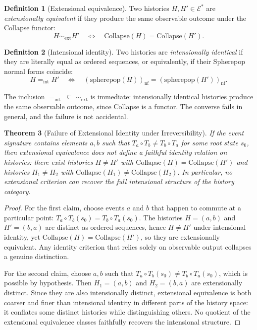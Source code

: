 \documentclass[12pt]{article}
\theoremstyle{plain}
\newtheorem{theorem}{Theorem}[section]
\theoremstyle{definition}
\newtheorem{definition}[theorem]{Definition}
\theoremstyle{remark}
\begin{document}
\begin{definition}[Extensional equivalence]
Two histories $H, H' \in \mathcal{E}^{*}$ are \emph{extensionally equivalent}
if they produce the same observable outcome under the Collapse functor:
\[
  H \sim_{\mathrm{ext}} H'
  \quad\Longleftrightarrow\quad
  \mathrm{Collapse}(H) = \mathrm{Collapse}(H').
\]
\end{definition}

\begin{definition}[Intensional identity]
Two histories are \emph{intensionally identical} if they are literally equal
as ordered sequences, or equivalently, if their Spherepop normal forms coincide:
\[
  H =_{\mathrm{int}} H'
  \quad\Longleftrightarrow\quad
  (\mathrm{spherepop}(H))_{\mathrm{nf}} = (\mathrm{spherepop}(H'))_{\mathrm{nf}}.
\]
\end{definition}

The inclusion $=_{\mathrm{int}} \;\subseteq\; \sim_{\mathrm{ext}}$ is
immediate: intensionally identical histories produce the same observable outcome,
since Collapse is a functor.  The converse fails in general, and the failure
is not accidental.

\begin{theorem}[Failure of Extensional Identity under Irreversibility]
\label{thm:necessity}
If the event signature contains elements $a, b$ such that
$T_a \circ T_b \neq T_b \circ T_a$ for some root state $s_0$, then
extensional equivalence does not define a faithful identity relation on
histories: there exist histories $H \neq H'$ with
$\mathrm{Collapse}(H) = \mathrm{Collapse}(H')$ and histories
$H_1 \neq H_2$ with $\mathrm{Collapse}(H_1) \neq \mathrm{Collapse}(H_2)$.
In particular, no extensional criterion can recover the full intensional
structure of the history category.
\end{theorem}

\begin{proof}
For the first claim, choose events $a$ and $b$ that happen to commute at a
particular point: $T_a \circ T_b(s_0) = T_b \circ T_a(s_0)$.  The histories
$H = (a, b)$ and $H' = (b, a)$ are distinct as ordered sequences, hence
$H \neq H'$ under intensional identity, yet $\mathrm{Collapse}(H) =
\mathrm{Collapse}(H')$, so they are extensionally equivalent.  Any identity
criterion that relies solely on observable output collapses a genuine
distinction.

For the second claim, choose $a, b$ such that
$T_a \circ T_b(s_0) \neq T_b \circ T_a(s_0)$, which is possible by hypothesis.
Then $H_1 = (a, b)$ and $H_2 = (b, a)$ are extensionally distinct.  Since they
are also intensionally distinct, extensional equivalence is both coarser and
finer than intensional identity in different parts of the history space: it
conflates some distinct histories while distinguishing others.  No quotient of
the extensional equivalence classes faithfully recovers the intensional
structure.
\end{proof}
\end{document}
